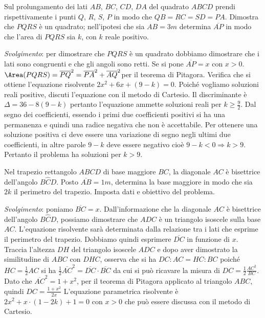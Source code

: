 \begin{multicols}{2}
\begin{esercizio}
 \label{ese:3.151}
Sul prolungamento dei lati $ AB $, $ BC $, $ CD $, $ DA $ del quadrato $ ABCD $ prendi rispettivamente i punti $ Q $, $ R $, $ S $, $ P $ in modo che $ QB=RC=SD=PA $. Dimostra che $ PQRS $ è un quadrato; nell'ipotesi che sia $AB = 3\unit{m}$ determina $\overline {AP}$ in modo che l'area di $ PQRS $ sia $ k $, con $ k $ reale positivo.
\begin{center}
 
\end{center}
\emph{Svolgimento}:
per dimostrare che $ PQRS $ è un quadrato dobbiamo dimostrare che i lati sono
congruenti e che gli angoli sono retti. Se si pone $\overline{AP} = x$ con $x > 0$.
$\Area(PQRS)= \overline {PQ}^{2} = \overline {PA}^{2} + \overline{AQ}^{2}$per il teorema di Pitagora.
Verifica che si ottiene l'equazione risolvente $2 x^{2} + 6 x + (9-k) = 0$. Poiché vogliamo soluzioni reali positive, discuti l'equazione con il metodo di Cartesio. Il discriminante è $\Delta = 36-8 (9-k)$ pertanto l'equazione ammette soluzioni reali per $k \geq \frac{9}{2}$. Dal segno dei coefficienti, essendo i primi due coefficienti positivi si ha una permanenza e quindi una radice negativa che non è accettabile. Per ottenere una soluzione positiva ci deve essere una variazione di segno negli ultimi due coefficienti, in altre parole $9-k$ deve essere negativo cioè $9-k < 0 \Rightarrow k > 9$. Pertanto il problema ha soluzioni per $k > 9$.
\end{esercizio}

\begin{esercizio}
 \label{ese:3.152}
Nel trapezio rettangolo $ ABCD $ di base maggiore $ BC $, la diagonale $ AC $ è bisettrice dell'angolo $B \widehat {C} D$. Posto $\overline {AB} = 1\unit{m}$, determina la base maggiore in modo che sia $ 2k $ il perimetro del trapezio. Imposta dati e obiettivo del problema.
\begin{center}
 
\end{center}
\emph{Svolgimento}: poniamo $\overline {BC} = x$. Dall'informazione che la diagonale $ AC $ è bisettrice dell'angolo $B \widehat {C} D$, possiamo dimostrare che $ ADC $ è un triangolo isoscele sulla base $ AC $. L'equazione risolvente sarà determinata dalla relazione tra i lati che esprime il perimetro del trapezio. Dobbiamo quindi esprimere $\overline {DC}$ in funzione di $ x $. Traccia l'altezza $ DH $ del triangolo isoscele $ ADC $ e dopo aver dimostrato la similitudine di $ ABC $ con $ DHC $, osserva che si ha $DC : AC = HC : BC$ poiché $HC = \frac{1}{2} AC$ si ha $\frac{1}{2} \overline {AC}^{2} = \overline {DC} \cdot \overline {BC}$ da cui si può ricavare la misura di $ DC = \frac{1}{2} \frac{AC^{2}}{BC}$. Dato che $\overline {AC}^{2}=1+x^2$, per il teorema di Pitagora applicato al triangolo $ ABC $, quindi $ DC = \frac{1 + x^2} {2 x} $ L'equazione parametrica risolvente è $2 x^{2} + x \cdot (1-2 k) + 1 = 0$ con $x > 0$ che può essere discussa con il metodo di Cartesio.
\end{esercizio}


\end{multicols}
